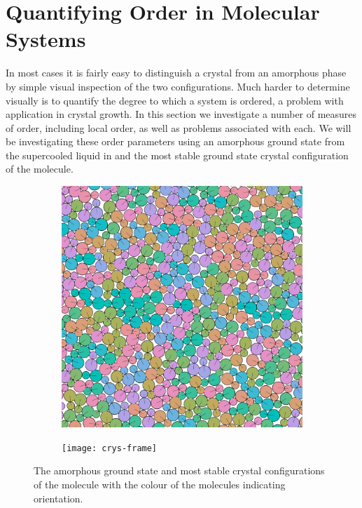 \section{Quantifying Order in Molecular Systems}
\label{sec:order parameter}

In most cases it is fairly easy to distinguish a crystal from an amorphous phase by simple visual inspection of the two configurations. Much harder to determine visually is to quantify the degree to which a system is ordered, a problem with application in crystal growth. In this section we investigate a number of measures of order, including local order, as well as problems associated with each. We will be investigating these order parameters using an amorphous ground state from the supercooled \dcon liquid in  and the most stable ground state crystal configuration~ of the \dcon molecule.

\begin{figure}
    \begin{subfigure}{0.5\textwidth}
        \includegraphics[width=\linewidth]{amorphous-frame}
        \caption{}
        \label{fig:amorphous frame}
    \end{subfigure}
    \begin{subfigure}{0.5\textwidth}
        \texttt{[image: crys-frame]}
        \caption{}
        \label{fig:crys frame}
    \end{subfigure}
    \caption{The amorphous ground state and most stable crystal  configurations of the \dcon molecule with the colour of the molecules indicating orientation.}
    \label{fig:frame comp}
\end{figure}

